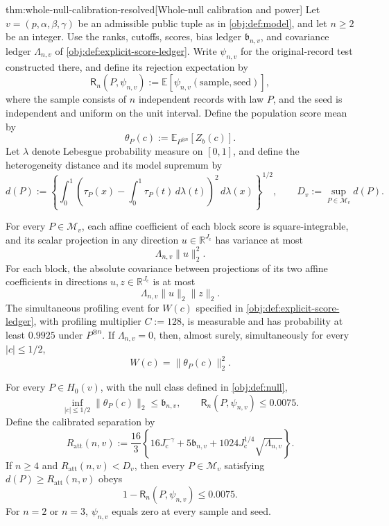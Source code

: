 \documentclass[11pt]{article}
\begin{document}
\begin{theoremv}{thm:whole-null-calibration-resolved}[Whole-null calibration and power]
Let \(v=(p,\alpha,\beta,\gamma)\) be an admissible public tuple as in \cref{obj:def:model}, and let \(n\ge2\) be an integer. Use the ranks, cutoffs, scores, bias ledger \(\mathfrak b_{n,v}\), and covariance ledger \(\Lambda_{n,v}\) of \cref{obj:def:explicit-score-ledger}. Write \(\psi_{n,v}\) for the original-record test constructed there, and define its rejection expectation by
\[
\mathsf R_n(P,\psi_{n,v})
:=\mathbb E\!\left[\psi_{n,v}(\text{sample},\text{seed})\right],
\]
where the sample consists of \(n\) independent records with law \(P\), and the seed is independent and uniform on the unit interval. Define the population score mean by
\[
\theta_P(c):=\mathbb E_{P^{\otimes n}}[Z_b(c)].
\]
Let \(\lambda\) denote Lebesgue probability measure on \([0,1]\), and define the heterogeneity distance and its model supremum by
\[
d(P):=
\left\{\int_0^1
\left(\tau_P(x)-\int_0^1\tau_P(t)\,d\lambda(t)\right)^2
\,d\lambda(x)\right\}^{1/2},
\qquad
D_v:=\sup_{P\in\mathcal M_v}d(P).
\]

For every \(P\in\mathcal M_v\), each affine coefficient of each block score is square-integrable, and its scalar projection in any direction \(u\in\mathbb R^{J_{\mathrm c}}\) has variance at most
\[
\Lambda_{n,v}\|u\|_2^2.
\]
For each block, the absolute covariance between projections of its two affine coefficients in directions \(u,z\in\mathbb R^{J_{\mathrm c}}\) is at most
\[
\Lambda_{n,v}\|u\|_2\|z\|_2.
\]
The simultaneous profiling event for \(W(c)\) specified in \cref{obj:def:explicit-score-ledger}, with profiling multiplier \(C:=128\), is measurable and has probability at least \(0.9925\) under \(P^{\otimes n}\). If \(\Lambda_{n,v}=0\), then, almost surely, simultaneously for every \(|c|\le1/2\),
\[
W(c)=\|\theta_P(c)\|_2^2.
\]

For every \(P\in H_0(v)\), with the null class defined in \cref{obj:def:null},
\[
\inf_{|c|\le1/2}\|\theta_P(c)\|_2\le\mathfrak b_{n,v},
\qquad
\mathsf R_n(P,\psi_{n,v})\le0.0075.
\]
Define the calibrated separation by
\[
R_{\mathrm{att}}(n,v)
:=\frac{16}{3}
\left\{
16J_{\mathrm c}^{-\gamma}
+5\mathfrak b_{n,v}
+1024J_{\mathrm c}^{1/4}\sqrt{\Lambda_{n,v}}
\right\}.
\]
If \(n\ge4\) and \(R_{\mathrm{att}}(n,v)<D_v\), then every \(P\in\mathcal M_v\) satisfying \(d(P)\ge R_{\mathrm{att}}(n,v)\) obeys
\[
1-\mathsf R_n(P,\psi_{n,v})\le0.0075.
\]
For \(n=2\) or \(n=3\), \(\psi_{n,v}\) equals zero at every sample and seed.
\end{theoremv}
\end{document}
